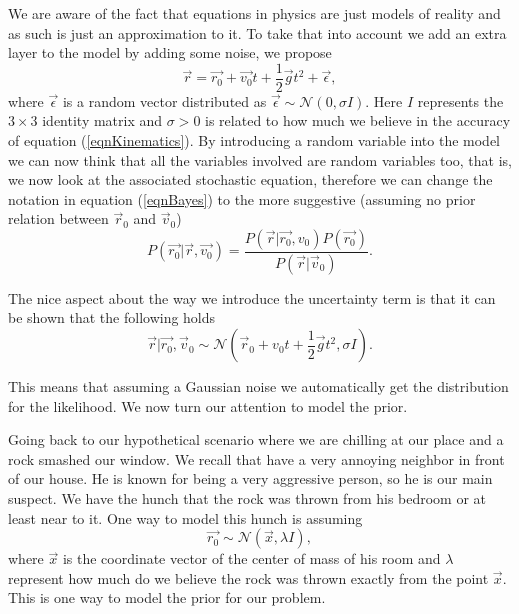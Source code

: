 \documentclass[12pt]{book}
\begin{document}
We are aware of the fact
that equations in physics are just models of reality and as such is just an approximation to it. To take
that into account we add an extra layer to the model by adding some noise, we propose 
\begin{equation*}
\vec{r}=\vec{r_{0}}+\vec{v_{0}}t+\frac{1}{2}\vec{g}t^{2}+\vec{\epsilon},
\end{equation*} 
where $\vec{\epsilon}$ is a random vector distributed as $\vec{\epsilon}\sim\mathscr{N}(0,\sigma I)$. Here $I$
represents the $3\times 3$ identity matrix and $\sigma>0$ is related to how much we believe in the accuracy
of equation (\ref{eqnKinematics}).  By introducing a random variable into the model
we can now think that all the variables involved 
are random variables too, that is, we now look at the  associated stochastic equation,
 therefore we can change the notation in equation (\ref{eqnBayes}) to 
the more suggestive (assuming no prior relation between $\vec{r}_{0}$ and $\vec{v}_{0}$)
\begin{equation*}
P(\vec{r_{0}}|\vec{r},\vec{v_{0}})=\frac{P(\vec{r}|\vec{r_{0}},v_{0})P(\vec{r_{0}})}{P(\vec{r}|\vec{v}_{0})}.
\end{equation*}



The nice aspect about the way we introduce the  uncertainty term  is that it can be shown that 
the following holds \cite{Somersalo}
\begin{equation*}
\vec{r}|\vec{r_{0}},\vec{v}_{0}\sim \mathscr{N}(\vec{r}_{0}+v_{0}t+\frac{1}{2}\vec{g}t^{2},\sigma I).
\end{equation*}

This means that assuming a Gaussian noise we automatically get the distribution  for the likelihood. 
We now turn our attention to model the prior.

Going back to  our hypothetical
scenario where we are chilling at our place and a rock smashed our window. We recall
that  have a very annoying neighbor in 
front of our house. He is known for being a very aggressive person, so he is our main suspect. We have the hunch
that the rock was thrown from his bedroom or at least near to it. One way to model this hunch is assuming
\begin{equation*}
\vec{r_{0}}\sim\mathscr{N}(\vec{x},\lambda I),
\end{equation*}
where $\vec{x}$ is the coordinate vector of the center of mass of his room and $\lambda$ represent how much do we believe
the rock was thrown exactly from the point $\vec{x}$. This is one way to model the prior for our problem.
\end{document}
